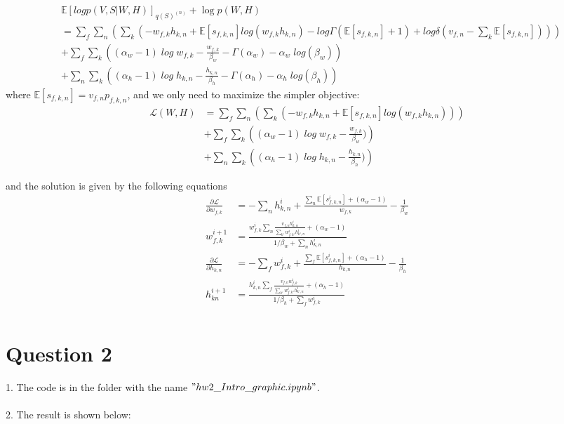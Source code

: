 \documentclass[12pt]{article}
\begin{document}
\begin{align*}
	&\mathbb{E}[log p(V,S|W,H)]_{q(S)^{(n)}} + \log p(W,H) \\
	&= \sum_f \sum_n \left( \sum_k (-w_{f,k}h_{k,n}+\mathbb{E}[s_{f,k,n}]log(w_{f,k}h_{k,n}) - log\Gamma(\mathbb{E}[s_{f,k,n}] + 1) + log\delta (v_{f,n} - \sum_k \mathbb{E}[s_{f,k,n}])) \right) \\
	&+  \sum_f\sum_k\left((\alpha_w - 1)\; log\; w_{f,k} - \frac{w_{f,k}}{\beta_w} - \Gamma(\alpha_w) - \alpha_w\;log(\beta_w)\right) \\
	&+ \sum_n\sum_k\left((\alpha_h - 1)\; log\; h_{k,n} - \frac{h_{k,n}}{\beta_h} - \Gamma(\alpha_h) - \alpha_h\;log(\beta_h)\right)
\end{align*} 
where $\mathbb{E}[s_{f,k,n}] = v_{f,n}p_{f,k,n}$, and we only need to maximize the simpler objective:
\begin{align*}
	\mathcal{L}(W,H) &= \sum_f \sum_n\left(\sum_k (-w_{f,k}h_{k,n}+\mathbb{E}[s_{f,k,n}]log(w_{f,k}h_{k,n}))\right)\\
	&+  \sum_f\sum_k\left((\alpha_w - 1)\; log\; w_{f,k} - \frac{w_{f,k}}{\beta_w})\right) \\
	&+ \sum_n\sum_k\left((\alpha_h - 1)\; log\; h_{k,n} - \frac{h_{k,n}}{\beta_h})\right)
\end{align*}

and the solution is given by the following equations
\begin{align*}
	\frac{\partial \mathcal{L}}{\partial w_{f,k}} &= -\sum_n h_{k,n}^{i} + \frac{\sum_n \mathbb{E}[s_{f,k,n}^{i}] + (\alpha_w - 1)}{w_{f,k}} - \frac{1}{\beta_w} \\
	w_{f,k}^{i+1} &=  \frac{w_{f,k}^i \sum_n \frac{v_{f,n}h_{k,n}^i}{\sum_{k'} w_{f,k'}^i h_{k',n}^i} + (\alpha_w - 1)}{1/\beta_w +  \sum_n h_{k,n}^i}\\
	\frac{\partial \mathcal{L}}{\partial h_{k,n}} &= -\sum_f w_{f,k}^{i} + \frac{\sum_f \mathbb{E}[s_{f,k,n}^{i}] + (\alpha_h - 1)}{h_{k,n}} - \frac{1}{\beta_h} \\
	h_{kn}^{i+1} &=  \frac{h_{k,n}^i \sum_f \frac{v_{f,n}w_{f,k}^i}{\sum_{k'} w_{f,k'}^i h_{k',n}^i} + (\alpha_h - 1)}{1/\beta_h + \sum_f w_{f,k}^i}\\
\end{align*}

\section*{Question 2}

1. The code is in the folder with the name $"hw2\_Intro\_graphic.ipynb"$.
\\\\
2. The result is shown below:
\end{document}
